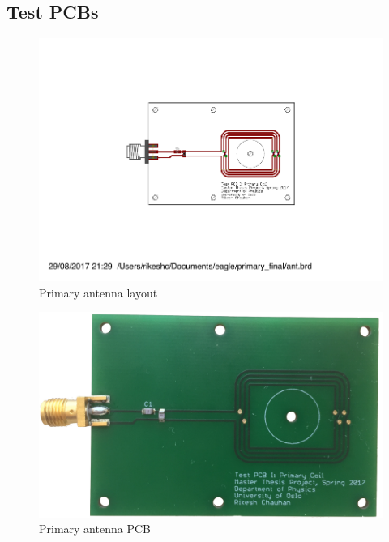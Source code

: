 \documentclass[12pt,a4paper,UKenglish]{report}
\begin{document}
\begin{appendices}
\chapter{Test PCBs}
\newpage
\begin{figure} [!htbp]	%
 	\centering
  	\includegraphics[width=1\textwidth]{appendix/pcb_pri.pdf} 
 	\caption{Primary antenna layout} 
	\label{fig:appen_primary_layout} 
\end{figure}

\begin{figure} [!htbp]	%
 	\centering
  	\includegraphics[width=1\textwidth]{pcb/test_pri.png} 
 	\caption{Primary antenna PCB} 
	\label{fig:appen_primary_pcb} 
\end{figure}


\end{appendices}
\end{document}

